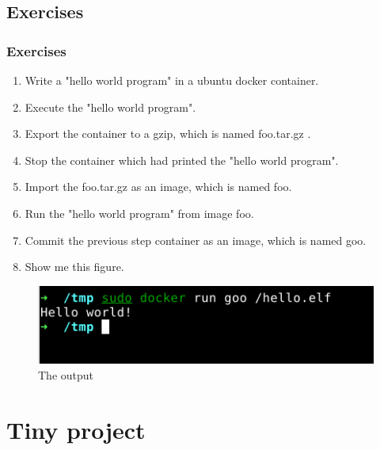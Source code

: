 \documentclass{beamer}
\begin{document}
\subsection{Exercises}
\begin{frame}
    \frametitle{Exercises}
    \begin{enumerate}
        \item Write a "hello world program" in a ubuntu docker container.
        \item Execute the "hello world program".
        \item Export the container to a gzip, which is named foo.tar.gz .
        \item Stop the container which had printed the "hello world program".
        \item Import the foo.tar.gz as an image, which is named foo.
        \item Run the "hello world program" from image foo.
        \item Commit the previous step container as an image, which is named goo.
        \item Show me this figure.
    \end{enumerate}
    \begin{figure}
        \centering\includegraphics[width=.5\textwidth]{goo.png}
        \caption{The output}
    \end{figure}
\end{frame}

\section{Tiny project}

\end{document}
